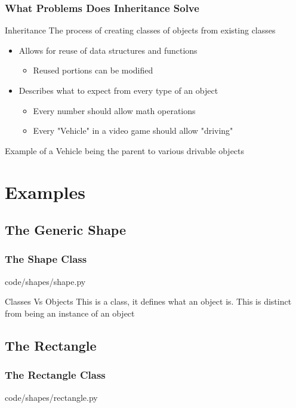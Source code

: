 \documentclass{beamer}
\begin{document}
  \begin{frame}
    \frametitle{What Problems Does Inheritance Solve}
    \begin{block}{Inheritance}
      The process of creating classes of objects from existing classes
    \end{block}
    \begin{itemize}
      \item<1->Allows for reuse of data structures and functions
        \begin{itemize}
          \item Reused portions can be modified
        \end{itemize}
      \item<2->Describes what to expect from every type of an object
        \begin{itemize}
          \item Every number should allow math operations
          \item Every "Vehicle" in a video game should allow "driving"
        \end{itemize}
    \end{itemize}
    \pause
    Example of a Vehicle being the parent to various drivable objects
  \end{frame}

\section{Examples}
\subsection{The Generic Shape}
  \begin{frame}
    \frametitle{The Shape Class}
    code/shapes/shape.py
    
    \begin{block}{Classes Vs Objects}
      This is a class, it defines what an object is.
      This is distinct from being an instance of an object
    \end{block}
  \end{frame}

\subsection{The Rectangle}
  \begin{frame}
    \frametitle{The Rectangle Class}
    code/shapes/rectangle.py
    
  \end{frame}
\end{document}

